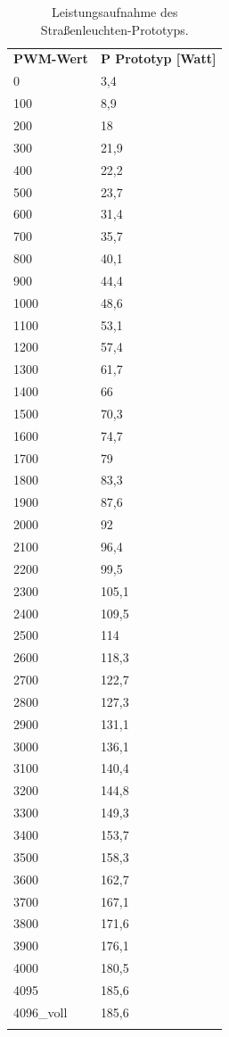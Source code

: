 \documentclass[a4paper,12pt]{scrartcl}
\begin{document}
\begin{longtable}[H]{p{35mm}>{\columncolor[gray]{0.97}}p{35mm}}
  \rowcolor[gray]{.9}
    \textbf{PWM-Wert} & \textbf{P Prototyp [Watt]}\\ 
0	&	3,4	\\
\rowcolor[gray]{.95}
100	&	8,9	\\
200	&	18	\\
\rowcolor[gray]{.95}
300	&	21,9	\\
400	&	22,2	\\
\rowcolor[gray]{.95}
500	&	23,7	\\
600	&	31,4	\\
\rowcolor[gray]{.95}
700	&	35,7	\\
800	&	40,1	\\
\rowcolor[gray]{.95}
900	&	44,4	\\
1000	&	48,6	\\
\rowcolor[gray]{.95}
1100	&	53,1	\\
1200	&	57,4	\\
\rowcolor[gray]{.95}
1300	&	61,7	\\
1400	&	66	\\
\rowcolor[gray]{.95}
1500	&	70,3	\\
1600	&	74,7	\\
\rowcolor[gray]{.95}
1700	&	79	\\
1800	&	83,3	\\
\rowcolor[gray]{.95}
1900	&	87,6	\\
2000	&	92	\\
\rowcolor[gray]{.95}
2100	&	96,4	\\
2200	&	99,5	\\
\rowcolor[gray]{.95}
2300	&	105,1	\\
2400	&	109,5	\\
\rowcolor[gray]{.95}
2500	&	114	\\
2600	&	118,3	\\
\rowcolor[gray]{.95}
2700	&	122,7	\\
2800	&	127,3	\\
\rowcolor[gray]{.95}
2900	&	131,1	\\
3000	&	136,1	\\
\rowcolor[gray]{.95}
3100	&	140,4	\\
3200	&	144,8	\\
\rowcolor[gray]{.95}
3300	&	149,3	\\
3400	&	153,7	\\
\rowcolor[gray]{.95}
3500	&	158,3	\\
3600	&	162,7	\\
\rowcolor[gray]{.95}
3700	&	167,1	\\
3800	&	171,6	\\
\rowcolor[gray]{.95}
3900	&	176,1	\\
4000	&	180,5	\\
\rowcolor[gray]{.95}
4095	&	185,6	\\
4096\_voll	&	185,6	\\
\caption{Leistungsaufnahme des Straßenleuchten-Prototyps.}
\label{tab:pprototyp}
\end{longtable}
\end{document}
